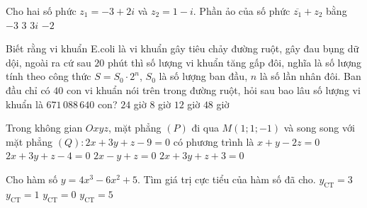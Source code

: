 \begin{ex}%
Cho hai số phức $z_1=-3+2i$ và $z_2=1-i$. Phần ảo của số phức $\overline{z_1}+z_2$ bằng	
	\choice
	{\True $-3$}
	{$3$}
	{$3i$}
	{$-2$}
\end{ex}

\begin{ex}%
Biết rằng vi khuẩn E.coli là vi khuẩn gây tiêu chảy đường ruột, gây đau bụng dữ dội, ngoài ra cứ sau $20$ phút thì số lượng vi khuẩn tăng gấp đôi, nghĩa là số lượng tính theo công thức $S=S_0\cdot 2^n$, $S_0$ là số lượng ban đầu, $n$ là số lần nhân đôi. Ban đầu chỉ có $40$ con vi khuẩn nói trên trong đường ruột, hỏi sau bao
lâu số lượng vi khuẩn là $671\,088\,640$ con?	
	\choice
	{$24$ giờ}
	{\True $8$ giờ}
	{$12$ giờ}
	{$48$ giờ}
\end{ex}

\begin{ex}%
	Trong không gian $Oxyz$, mặt phẳng $(P) $ đi qua $M(1;1;-1)$ và song song với mặt phẳng $(Q)\colon 2x+3y+z-9=0$ có phương trình là
	\choice
	{$x+y-2z=0$}
	{\True $2x+3y+z-4=0$}
	{$2x-y+z=0$}
	{$2x+3y+z+3=0$}
\end{ex}

\begin{ex}%
	Cho hàm số $y=4x^3-6x^2+5$. Tìm giá trị cực tiểu của hàm số đã cho.
	\choice
	{\True $y_{\text{CT}}=3$}
	{$y_{\text{CT}}=1$}
	{$y_{\text{CT}}=0$}
	{$y_{\text{CT}}=5$}
\end{ex}

